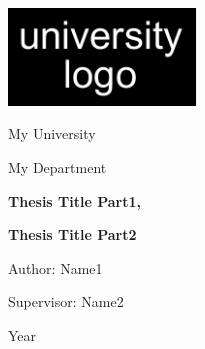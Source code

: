 
\thispagestyle{empty}
\begin{center}
%
\includegraphics[width=5cm]{frontmatter/fig/logo_university}\\
%
%
{{\large My University} \par}
%
%
{{\large My Department} \par}
%
%
{ \LARGE {\bfseries {Thesis Title Part1,}} \par}
%
%
{ \LARGE {\bfseries {Thesis Title Part2}} \par}
%
%
{{\large Author: Name1} \par}
%
%
{{\large Supervisor: Name2} \par}
%

%
{{\large Year} \par}
%


\end{center}

%
%
